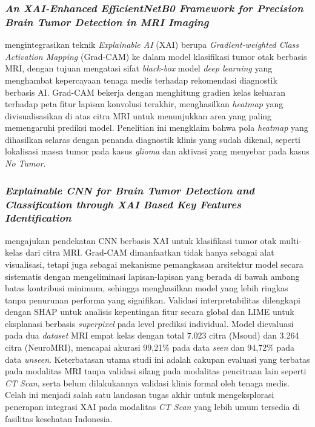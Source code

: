\subsubsection{\textit{An XAI-Enhanced EfficientNetB0 Framework for Precision Brain Tumor Detection in MRI Imaging}}

\textcite{mahesh2024xai} mengintegrasikan teknik \textit{Explainable AI} (XAI) berupa \textit{Gradient-weighted Class Activation Mapping} (Grad-CAM) ke dalam model klasifikasi tumor otak berbasis MRI, dengan tujuan mengatasi sifat \textit{black-box} model \textit{deep learning} yang menghambat kepercayaan tenaga medis terhadap rekomendasi diagnostik berbasis AI. Grad-CAM bekerja dengan menghitung gradien kelas keluaran terhadap peta fitur lapisan konvolusi terakhir, menghasilkan \textit{heatmap} yang divisualisasikan di atas citra MRI untuk menunjukkan area yang paling memengaruhi prediksi model. Penelitian ini mengklaim bahwa pola \textit{heatmap} yang dihasilkan selaras dengan penanda diagnostik klinis yang sudah dikenal, seperti lokalisasi massa tumor pada kasus \textit{glioma} dan aktivasi yang menyebar pada kasus \textit{No Tumor}.

\subsubsection{\textit{Explainable CNN for Brain Tumor Detection and Classification through XAI Based Key Features Identification}}

\textcite{Iftikhar2025ExplainableCNN} mengajukan pendekatan CNN berbasis XAI untuk klasifikasi tumor otak multi-kelas dari citra MRI. Grad-CAM dimanfaatkan tidak hanya sebagai alat visualisasi, tetapi juga sebagai mekanisme pemangkasan arsitektur model secara sistematis dengan mengeliminasi lapisan-lapisan yang berada di bawah ambang batas kontribusi minimum, sehingga menghasilkan model yang lebih ringkas tanpa penurunan performa yang signifikan. Validasi interpretabilitas dilengkapi dengan SHAP untuk analisis kepentingan fitur secara global dan LIME untuk eksplanasi berbasis \textit{superpixel} pada level prediksi individual. Model dievaluasi pada dua \textit{dataset} MRI empat kelas dengan total 7.023 citra (Msoud) dan 3.264 citra (NeuroMRI), mencapai akurasi 99,21\% pada data \textit{seen} dan 94,72\% pada data \textit{unseen}. Keterbatasan utama studi ini adalah cakupan evaluasi yang terbatas pada modalitas MRI tanpa validasi silang pada modalitas pencitraan lain seperti \textit{CT Scan}, serta belum dilakukannya validasi klinis formal oleh tenaga medis. Celah ini menjadi salah satu landasan tugas akhir untuk mengeksplorasi penerapan integrasi XAI pada modalitas \textit{CT Scan} yang lebih umum tersedia di fasilitas kesehatan Indonesia.

